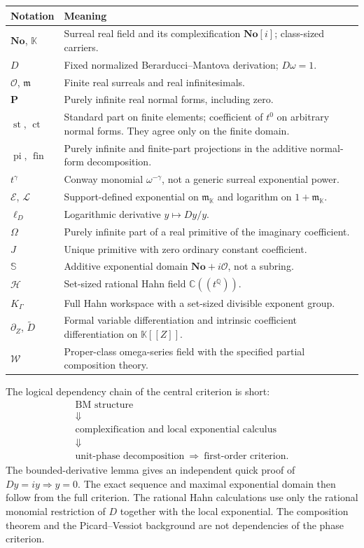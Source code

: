 \documentclass[11pt,a4paper]{article}
\numberwithin{equation}{section}
\theoremstyle{definition}
\theoremstyle{remark}
\newcommand{\No}{\mathbf{No}}
\newcommand{\K}{\mathbb K}
\newcommand{\C}{\mathbb C}
\newcommand{\Q}{\mathbb Q}
\newcommand{\OO}{\mathcal O}
\newcommand{\mm}{\mathfrak m}
\newcommand{\PP}{\mathbf P}
\newcommand{\HH}{\mathscr H}
\newcommand{\EE}{\mathcal E}
\newcommand{\LL}{\mathcal L}
\newcommand{\DD}{\widetilde D}
\newcommand{\ct}{\operatorname{ct}}
\newcommand{\st}{\operatorname{st}}
\newcommand{\fin}{\operatorname{fin}}
\newcommand{\pipart}{\operatorname{pi}}
\newcommand{\Dlog}{\ell_D}
\newcommand{\PS}{\mathbb S}
\begin{document}
\begin{longtable}{@{}p{}p{}@{}}
\toprule
Notation & Meaning\\
\midrule
\endhead
$\No$, $\K$ & Surreal real field and its complexification $\No[i]$; class-sized carriers.\\[3pt]
$D$ & Fixed normalized Berarducci--Mantova derivation; $D\omega=1$.\\[3pt]
$\OO$, $\mm$ & Finite real surreals and real infinitesimals.\\[3pt]
$\PP$ & Purely infinite real normal forms, including zero.\\[3pt]
$\st$, $\ct$ & Standard part on finite elements; coefficient of $t^0$ on arbitrary normal forms. They agree only on the finite domain.\\[3pt]
$\pipart$, $\fin$ & Purely infinite and finite-part projections in the additive normal-form decomposition.\\[3pt]
$t^\gamma$ & Conway monomial $\omega^{-\gamma}$, not a generic surreal exponential power.\\[3pt]
$\EE$, $\LL$ & Support-defined exponential on $\mm_\K$ and logarithm on $1+\mm_\K$.\\[3pt]
$\Dlog$ & Logarithmic derivative $y\mapsto Dy/y$.\\[3pt]
$\Omega$ & Purely infinite part of a real primitive of the imaginary coefficient.\\[3pt]
$J$ & Unique primitive with zero ordinary constant coefficient.\\[3pt]
$\PS$ & Additive exponential domain $\No+i\OO$, not a subring.\\[3pt]
$\HH$ & Set-sized rational Hahn field $\C((t^\Q))$.\\[3pt]
$K_\Gamma$ & Full Hahn workspace with a set-sized divisible exponent group.\\[3pt]
$\partial_Z$, $\DD$ & Formal variable differentiation and intrinsic coefficient differentiation on $\K[[Z]]$.\\[3pt]
$\mathscr W$ & Proper-class omega-series field with the specified partial composition theory.\\
\bottomrule
\end{longtable}

The logical dependency chain of the central criterion is short:
\[
 \begin{gathered}
 \text{BM structure}\\
 \Downarrow\\
 \text{complexification and local exponential calculus}\\
 \Downarrow\\
 \text{unit-phase decomposition}\ \Longrightarrow\
 \text{first-order criterion}.
 \end{gathered}
\]
The bounded-derivative lemma gives an independent quick proof of
$Dy=iy\Rightarrow y=0$. The exact sequence and maximal exponential domain
then follow from the full criterion. The rational Hahn calculations use
only the rational monomial restriction of $D$ together with the local
exponential. The composition theorem and the Picard--Vessiot background
are not dependencies of the phase criterion.
\end{document}
